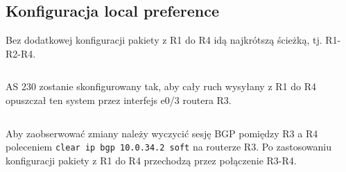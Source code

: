 \documentclass[a4paper,12pt,notitlepage]{article}
\begin{document}
\subsection{Konfiguracja local preference}

Bez dodatkowej konfiguracji pakiety z R1 do R4 idą najkrótszą ścieżką, tj. R1-R2-R4.

\inputminted[label=Komunikacja między R1 i R4 bez local preference, firstline=339, lastline=345]{text}{Routers/R1.txt}%

AS 230 zostanie skonfigurowany tak, aby cały ruch wysyłany z R1 do R4 opuszczał ten system przez interfejs e0/3 routera R3.

\inputminted[label=Ustawianie local preference na R3, firstline=931, lastline=935]{text}{Routers/R3.txt}%

Aby zaobserwować zmiany należy wyczycić sesję BGP pomiędzy R3 a R4 poleceniem \texttt{clear ip bgp 10.0.34.2 soft} na routerze R3. Po zastosowaniu konfiguracji pakiety z R1 do R4 przechodzą przez połączenie R3-R4.

\inputminted[label=Komunikacja między R1 i R4 z local preference, firstline=346, lastline=353]{text}{Routers/R1.txt}%
\end{document}
